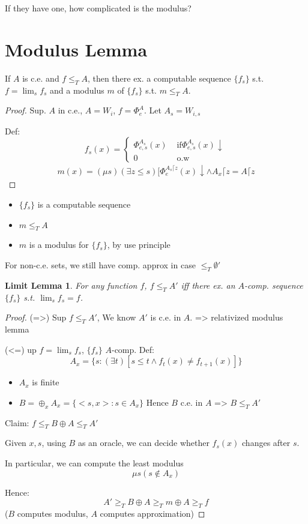 \documentclass[12pt]{article}
\begin{document}
If they have one, how complicated is the modulus?

\section*{Modulus Lemma}
If $A$ is c.e. and $f \le_T A$, then there ex. a computable sequence
$\{ f_s\}$ s.t. $f = \lim_s f_s$ 
and a modulus $m$ of $\{ f_s\}$ s.t. $m \le_T A$.
\begin{proof}
 Sup. $A$ in c.e., $A = W_i$, $f = \Phi^A_e$.
Let $A_s = W_{i,s}$

Def:
\[
 f_s(x) = \begin{cases}
           \Phi^{A_s}_{e,s}(x)	&\text{ if} \Phi^{A_s}_{e,s}(x) \downarrow \\
           0			&\text{ o.w}
          \end{cases}
\]
\begin{align*}
 m(x) = (\mu s)(\exists z \le s) [ \Phi^{A_s \lceil z}_e (x) \downarrow \wedge A_x\lceil z = A \lceil z
\end{align*}
\end{proof}
\begin{itemize}
 \item $\{f_s\}$ is a computable sequence
 \item $m \le_T A$
 \item $m$ is a modulus for $\{f_s\}$, by use principle
\end{itemize}
For non-c.e. sets, we still have comp. approx in case $\le_T \emptyset'$

\newtheorem{limitlemma}{Limit Lemma}
\begin{limitlemma}
 For any function $f$,
$f \le_T A'$ iff there ex. an $A$-comp. sequence
$\{f_s\}$ s.t. $\lim_s f_s = f$.
\end{limitlemma}
\begin{proof}
 (=>) Sup $f \le_T A'$, We know $A'$ is c.e. in $A$.
	=> relativized modulus lemma

 (<=) up $f = \lim_s f_s$, $\{f_s\}$ $A$-comp.
Def: 
\[
 A_x = \{ s : (\exists t) [ s \le t \wedge f_t(x) \ne f_{t+1}(x) ] \}
\] %

\begin{itemize}
 \item $A_x$ is finite
 \item $B = \oplus_x A_x = \{ <s,x> : s \in A_x \}$
	Hence $B$ c.e. in $A$
	=> $B \le_T A'$
\end{itemize}

Claim: $f \le_T B \oplus A \le_T A'$

Given $x,s$, using $B$ as an oracle, we can decide whether $f_s(x)$ changes after $s$.

In particular, we can compute the least modulus 
\[
 \mu s (s \not\in A_x)
\]

Hence: \[
A' \ge_T B \oplus A \ge_T m \oplus A \ge_T f
       \]
($B$ computes modulus, $A$ computes approximation)
\end{proof}
\end{document}

